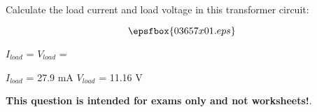 

Calculate the load current and load voltage in this transformer circuit:

$$\epsfbox{03657x01.eps}$$

$I_{load}$ = \hskip 80pt $V_{load}$ =

\vskip 10pt







$I_{load}$ = 27.9 mA \hskip 80pt $V_{load}$ = 11.16 V







{\bf This question is intended for exams only and not worksheets!}.



